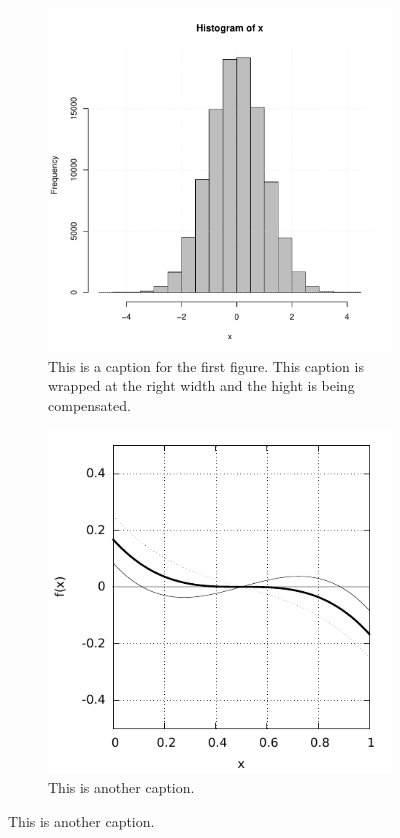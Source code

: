 \documentclass[english, twoside, 12pt, a4paper]{article}
\theoremstyle{definition}
\theoremstyle{plain}
\theoremstyle{remark}
\begin{document}
\begin{figure}[hbt]
  \centering
  \begin{subfigure}[t]{0.45\textwidth}
    \includegraphics[width=\textwidth]{./figure-1}
    \caption{This is a caption for the first figure. This caption is wrapped at the right width and the hight is being compensated.}
    \label{fig:xxxa}
  \end{subfigure}
  \hfill
  \begin{subfigure}[t]{0.45\textwidth}
    \includegraphics[width=\textwidth]{figure-2}
    \caption{This is another caption.}
    \label{fig:xxxb}
  \end{subfigure}
  

\end{figure}
\end{document}

